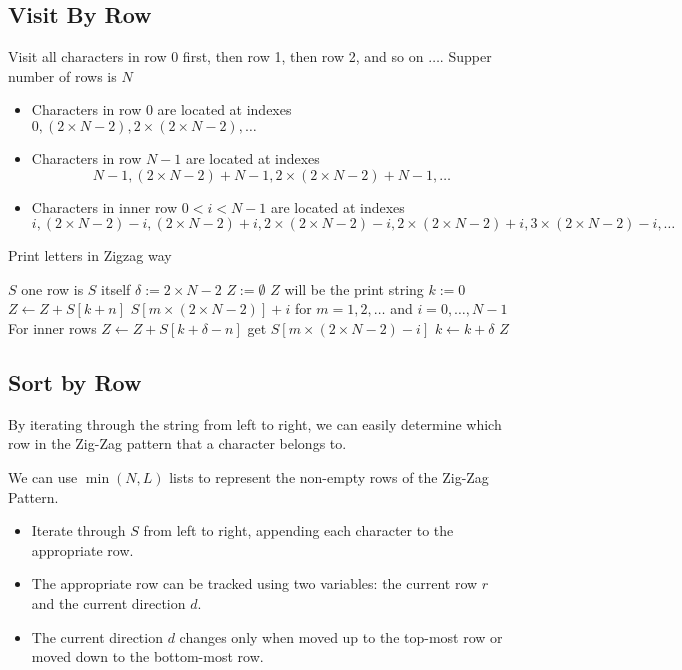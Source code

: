 \subsection{Visit By Row}
Visit all characters in row 0 first, then row 1, then row 2, and so on $\dots$. Supper number of rows is $N$
\begin{itemize}
	\item Characters in row $0$ are located at indexes $0, \left(2 \times N - 2\right), 2\times\left(2 \times N - 2\right), \ldots$
	\item Characters in row $N-1$ are located at indexes 
	\[N-1, \left(2 \times N - 2\right) + N - 1, 2\times\left(2 \times N - 2\right) + N - 1, \ldots\]
	\item Characters in inner row $0<i<N-1$ are located at indexes 
	\[
	i, \left(2 \times N - 2\right)-i, \left(2 \times N - 2\right) + i, 2\times\left(2 \times N - 2\right)- i, 2\times\left(2 \times N - 2\right)+ i, 3\times\left(2 \times N - 2\right)- i, \dots
	\]
\end{itemize}
\setcounter{algorithm}{0}
\begin{algorithm}[H]
	\caption{Print letters in Zigzag way}
	\begin{algorithmic}[1]
		\State \Return $S$ \Comment one row is $S$ itself
		\EndIf
		\State $\delta := 2 \times N -2$
		\State $Z:= \emptyset$ \Comment $Z$ will be the print string
		\State $k:= 0$
		\State $Z \gets Z + S[k+n]$ \Comment $S[m\times \left(2 \times N - 2\right)] + i$ for $m = 1,2, \ldots$ and $i = 0, \ldots, N-1$
		 \Comment For inner rows
		\State $Z \gets Z + S[k+\delta-n]$ \Comment get $S[m\times\left(2 \times N - 2\right)- i]$
		\EndIf
		\State $k \gets k+\delta$
		\EndWhile
		\EndFor
		\State \Return $Z$
		\EndProcedure
		\Statex
	\end{algorithmic}
\end{algorithm}
\subsection{Sort by Row}
By iterating through the string from left to right, we can easily determine which row in the Zig-Zag pattern that a character belongs to.
\par
We can use $\min(N,L)$  lists to represent the non-empty rows of the Zig-Zag Pattern.

\begin{itemize}
	\item Iterate through $S$ from left to right, appending each character to the appropriate row. 
	\item The appropriate row can be tracked using two variables: the current row $r$ and the current direction $d$.
	\item The current direction $d$ changes only when moved up to the top-most row or moved down to the bottom-most row.
\end{itemize}

